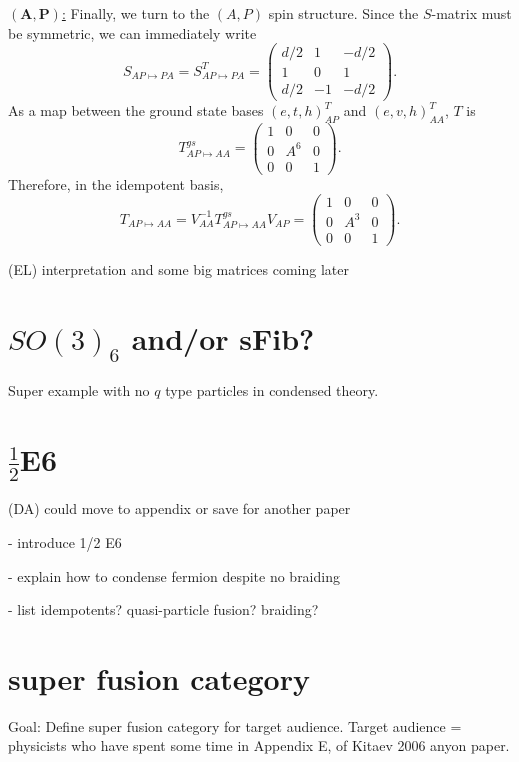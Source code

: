 \documentclass[12pt,a4paper]{article}
\newcommand\be            {\begin{equation}}
\newcommand\ee            {\end{equation}}
\newcommand{\dave}[1]{{\color{ao(english)}\footnotesize{(DA) #1}}}
\newcommand{\ethan}[1]{{\color{amethyst}\footnotesize{(EL) #1}}}
\begin{document}
\underline{$\mathbf{(A,P)}$:} Finally, we turn to the $(A,P)$ spin structure. 
Since the $S$-matrix must be symmetric, we can immediately write 
\be S_{AP \mapsto PA} =  S_{AP \mapsto PA}^T = \begin{pmatrix}
d/2 & 1 & -d/2 \\ 1 & 0 & 1 \\ d/2 & -1 & -d/2
\end{pmatrix}.\ee
As a map between the ground state bases $(e,t,h)^T_{AP}$ and $(e,v,h)^T_{AA}$, $T$ is 
\be T^{gs}_{AP \mapsto AA} = \begin{pmatrix}
1 &0&0 \\ 0&A^6 &0\\0&0&1
\end{pmatrix}.\ee
Therefore, in the idempotent basis, 
\be T_{AP\mapsto AA} = V_{AA}^{-1} T^{gs}_{AP\mapsto AA} V_{AP} = \begin{pmatrix}
1 &0&0 \\ 0&A^3&0\\0&0&1
\end{pmatrix}.\ee

\ethan{interpretation and some big matrices coming later}



\section{$SO(3)_6$ and/or sFib?}
Super example with no $q$ type particles in condensed theory.

\section{$\frac{1}{2}$E6}

\dave{could move to appendix or save for another paper}

- introduce 1/2 E6

- explain how to condense fermion despite no braiding

- list idempotents? quasi-particle fusion? braiding? 

\section{super fusion category}
Goal: Define super fusion category for target audience. Target audience = physicists who have spent some time in Appendix E, of Kitaev 2006 anyon paper.
\end{document}

